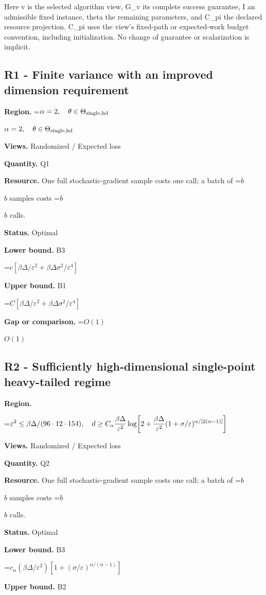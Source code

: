 \documentclass[10pt,a4paper]{article}
\newcommand{\AtlasMath}[1]{\par\begingroup\centering\setbox0=\hbox{$\displaystyle #1$}\ifdim\wd0>1.4\linewidth\typeout{ATLAS WIDE FORMULA: \the\wd0}\fi\ifdim\wd0>\linewidth\resizebox{\linewidth}{!}{\box0}\else\box0\fi\par\endgroup}
\newcommand{\AtlasInlineMath}[1]{\begingroup\setbox0=\hbox{$#1$}\ifdim\wd0>.4\linewidth\endgroup\AtlasMath{#1}\else\endgroup$#1$\fi}
\begin{document}
Here v is the selected algorithm view, G\_v its complete success guarantee, I an admissible fixed instance, theta the remaining parameters, and C\_pi the declared resource projection. C\_pi uses the view's fixed-path or expected-work budget convention, including initialization. No change of guarantee or scalarization is implicit.

\subsection{R1 - Finite variance with an improved dimension requirement}
\textbf{Region.} \AtlasInlineMath{\alpha=2,\quad\theta\in\Theta_{\rm single,hd}}

\textbf{Views.} Randomized / Expected loss

\textbf{Quantity.} Q1

\textbf{Resource.} One full stochastic-gradient sample costs one call; a batch of \AtlasInlineMath{b} samples costs \AtlasInlineMath{b} calls.

\textbf{Status.} Optimal

\textbf{Lower bound.} B3

\AtlasMath{c[\beta\Delta/\varepsilon^2+\beta\Delta\sigma^2/\varepsilon^4]}
\textbf{Upper bound.} B1

\AtlasMath{C[\beta\Delta/\varepsilon^2+\beta\Delta\sigma^2/\varepsilon^4]}
\textbf{Gap or comparison.} \AtlasInlineMath{O(1)}

\subsection{R2 - Sufficiently high-dimensional single-point heavy-tailed regime}
\textbf{Region.} 
\AtlasMath{\varepsilon^2\le\beta\Delta/(96\cdot12\cdot154),\quad d\ge C_\alpha {\beta\Delta\over\varepsilon^2}\log\!\left[2+{\beta\Delta\over\varepsilon^2}(1+\sigma/\varepsilon)^{\alpha/[2(\alpha-1)]}\right]}


\textbf{Views.} Randomized / Expected loss

\textbf{Quantity.} Q2

\textbf{Resource.} One full stochastic-gradient sample costs one call; a batch of \AtlasInlineMath{b} samples costs \AtlasInlineMath{b} calls.

\textbf{Status.} Optimal

\textbf{Lower bound.} B3

\AtlasMath{c_\alpha (\beta\Delta/\varepsilon^2)[1+(\sigma/\varepsilon)^{\alpha/(\alpha-1)}]}
\textbf{Upper bound.} B2
\end{document}
